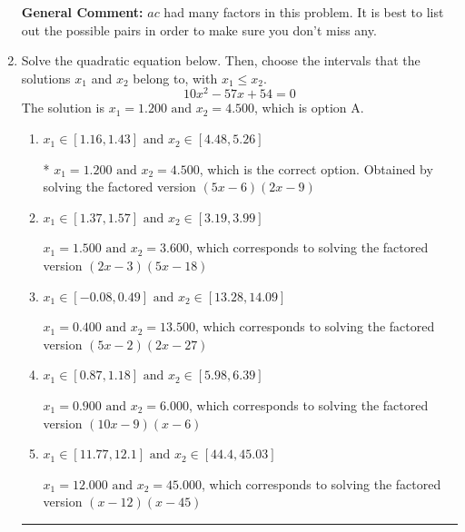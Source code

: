 \documentclass{extbook}[14pt]
\newcommand{\litem}[1]{\item #1

\rule{\textwidth}{0.4pt}}
\begin{document}
\begin{enumerate}
{\textbf{General Comment:} $ac$ had many factors in this problem. It is best to list out the possible pairs in order to make sure you don't miss any.
}
\litem{
Solve the quadratic equation below. Then, choose the intervals that the solutions $x_1$ and $x_2$ belong to, with $x_1 \leq x_2$.
\[ 10x^{2} -57 x + 54 = 0 \]The solution is \( x_1 = 1.200 \text{ and } x_2 = 4.500 \), which is option A.\begin{enumerate}[label=\Alph*.]
\item \( x_1 \in [1.16, 1.43] \text{ and } x_2 \in [4.48, 5.26] \)

* $x_1 = 1.200 \text{ and } x_2 = 4.500$, which is the correct option. Obtained by solving the factored version $(5x -6)(2x -9)$
\item \( x_1 \in [1.37, 1.57] \text{ and } x_2 \in [3.19, 3.99] \)

$x_1 = 1.500 \text{ and } x_2 = 3.600$, which corresponds to solving the factored version $(2x -3)(5x -18)$
\item \( x_1 \in [-0.08, 0.49] \text{ and } x_2 \in [13.28, 14.09] \)

$x_1 = 0.400 \text{ and } x_2 = 13.500$, which corresponds to solving the factored version $(5x -2)(2x -27)$
\item \( x_1 \in [0.87, 1.18] \text{ and } x_2 \in [5.98, 6.39] \)

$x_1 = 0.900 \text{ and } x_2 = 6.000$, which corresponds to solving the factored version $(10x -9)(x -6)$
\item \( x_1 \in [11.77, 12.1] \text{ and } x_2 \in [44.4, 45.03] \)

$x_1 = 12.000 \text{ and } x_2 = 45.000$, which corresponds to solving the factored version $(x -12)(x -45)$
\end{enumerate}

}
\end{enumerate}
\end{document}
